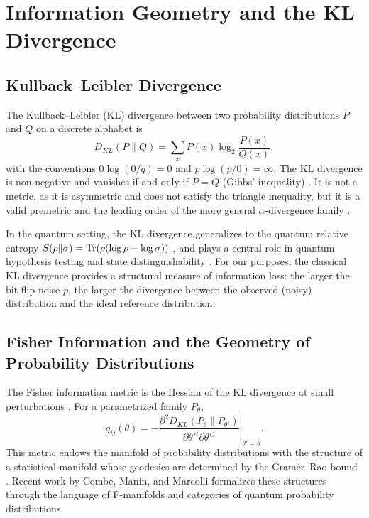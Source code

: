 \documentclass[12pt,a4paper,oneside]{book}
\theoremstyle{plain}
\theoremstyle{definition}
\theoremstyle{remark}
\begin{document}
\section{Information Geometry and the KL Divergence}
\label{sec:info_geometry}

\subsection{Kullback--Leibler Divergence}

The Kullback--Leibler (KL) divergence \cite{kullback1951information} between two probability distributions $P$ and $Q$ on a discrete alphabet is
\begin{equation}
    \label{eq:kl_divergence}
    D_{KL}(P \| Q) = \sum_x P(x) \log_2 \frac{P(x)}{Q(x)},
\end{equation}
with the conventions $0 \log(0/q) = 0$ and $p \log(p/0) = \infty$. The KL divergence is non-negative and vanishes if and only if $P = Q$ (Gibbs' inequality) \cite{cover2006elements}. It is not a metric, as it is asymmetric and does not satisfy the triangle inequality, but it is a valid premetric and the leading order of the more general $\alpha$-divergence family \cite{amari2007methods}.

In the quantum setting, the KL divergence generalizes to the quantum relative entropy $S(\rho \| \sigma) = \Tr(\rho (\log \rho - \log \sigma))$ \cite{umegaki1962conditional, nielsen2010quantum}, and plays a central role in quantum hypothesis testing and state distinguishability \cite{flammia2024chisq}. For our purposes, the classical KL divergence provides a structural measure of information loss: the larger the bit-flip noise $p$, the larger the divergence between the observed (noisy) distribution and the ideal reference distribution.

\subsection{Fisher Information and the Geometry of Probability Distributions}

The Fisher information metric is the Hessian of the KL divergence at small perturbations \cite{amari2007methods, combe2022geometry}. For a parametrized family $P_\theta$,
\begin{equation}
    g_{ij}(\theta) = - \left. \frac{\partial^2 D_{KL}(P_\theta \| P_{\theta'})}{\partial \theta'^i \partial \theta'^j} \right|_{\theta' = \theta}.
\end{equation}
This metric endows the manifold of probability distributions with the structure of a statistical manifold whose geodesics are determined by the Cram\'er--Rao bound \cite{amari2007methods}. Recent work by Combe, Manin, and Marcolli \cite{combe2022geometry} formalizes these structures through the language of F-manifolds and categories of quantum probability distributions.
\end{document}
